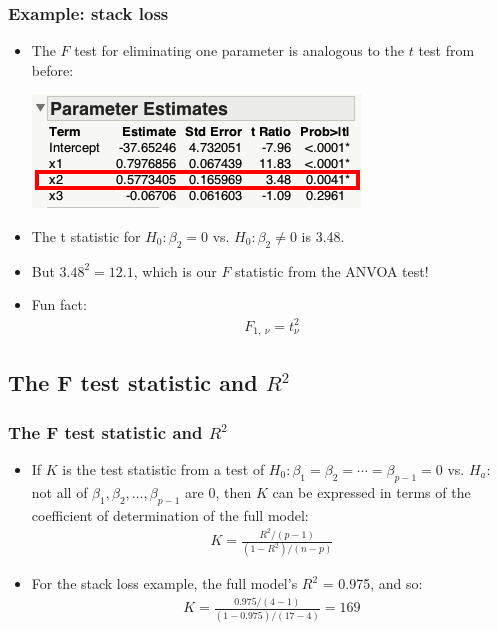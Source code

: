 \documentclass[handout]{beamer}\usepackage[]{graphicx}\usepackage[]{color}
\numberwithin{equation}{section}
\begin{document}
\begin{frame}
\frametitle{Example: stack loss}
\begin{itemize}
\item The $F$ test for eliminating one parameter is analogous to the $t$ test from before:
\begin{center}
 \includegraphics{../../fig/funfacttftest.png}
\end{center} 
\pause \item The t statistic for $H_0: \beta_2 = 0$ vs. $H_0: \beta_2 \ne 0$ is 3.48.
\pause \item But $3.48^2 = 12.1$, which is our $F$ statistic from the ANVOA test!
\pause \item Fun fact:
\begin{align*}
F_{1, \ \nu} = t_{\nu}^2
\end{align*}
\end{itemize}
\end{frame}


\subsection{The F test statistic and $R^2$}

\begin{frame}
\frametitle{The F test statistic and $R^2$}
\begin{itemize}
\item If $K$ is the test statistic from a test of $H_0: \beta_1 = \beta_2 = \cdots = \beta_{p - 1} = 0$ vs. $H_a:$ not all of $\beta_1, \beta_2, \ldots, \beta_{p-1}$ are 0, then $K$ can be expressed in terms of the coefficient of determination of the full model:
\pause \begin{align*}
K = \frac{R^2/(p-1)}{(1-R^2)/(n - p)}
\end{align*}
\pause \item For the stack loss example, the full model's $R^2$ = 0.975, and so:
\begin{align*}
K = \frac{0.975 / (4-1)}{(1-0.975)/(17-4)} = 169
\end{align*}
\end{itemize}
\end{frame}
\end{document}
